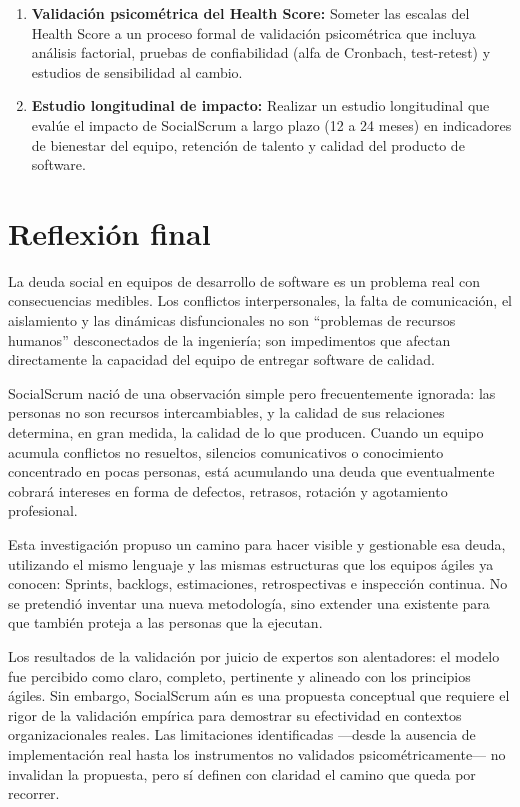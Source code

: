 \begin{enumerate}
    \item \textbf{Validación psicométrica del Health Score:} Someter las escalas del Health Score a un proceso formal de validación psicométrica que incluya análisis factorial, pruebas de confiabilidad (alfa de Cronbach, test-retest) y estudios de sensibilidad al cambio.

    \item \textbf{Estudio longitudinal de impacto:} Realizar un estudio longitudinal que evalúe el impacto de SocialScrum a largo plazo (12 a 24 meses) en indicadores de bienestar del equipo, retención de talento y calidad del producto de software.
\end{enumerate}

\section{Reflexión final}
\label{sec:reflexion-final}

La deuda social en equipos de desarrollo de software es un problema real con consecuencias medibles. Los conflictos interpersonales, la falta de comunicación, el aislamiento y las dinámicas disfuncionales no son ``problemas de recursos humanos'' desconectados de la ingeniería; son impedimentos que afectan directamente la capacidad del equipo de entregar software de calidad.

SocialScrum nació de una observación simple pero frecuentemente ignorada: las personas no son recursos intercambiables, y la calidad de sus relaciones determina, en gran medida, la calidad de lo que producen. Cuando un equipo acumula conflictos no resueltos, silencios comunicativos o conocimiento concentrado en pocas personas, está acumulando una deuda que eventualmente cobrará intereses en forma de defectos, retrasos, rotación y agotamiento profesional.

Esta investigación propuso un camino para hacer visible y gestionable esa deuda, utilizando el mismo lenguaje y las mismas estructuras que los equipos ágiles ya conocen: Sprints, backlogs, estimaciones, retrospectivas e inspección continua. No se pretendió inventar una nueva metodología, sino extender una existente para que también proteja a las personas que la ejecutan.

Los resultados de la validación por juicio de expertos son alentadores: el modelo fue percibido como claro, completo, pertinente y alineado con los principios ágiles. Sin embargo, SocialScrum aún es una propuesta conceptual que requiere el rigor de la validación empírica para demostrar su efectividad en contextos organizacionales reales. Las limitaciones identificadas ---desde la ausencia de implementación real hasta los instrumentos no validados psicométricamente--- no invalidan la propuesta, pero sí definen con claridad el camino que queda por recorrer.


